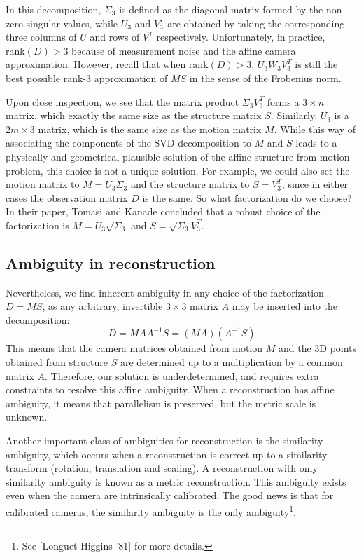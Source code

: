 \documentclass[a4paper, 12pt]{article}
\numberwithin{equation}{section}
\begin{document}
In this decomposition, $\Sigma_3$ is defined as the diagonal matrix formed by the non-zero singular values, while $U_3$ and $V^T_3$ are obtained by taking the corresponding three columns of $U$ and rows of $V^T$ respectively. Unfortunately, in practice, $\mathrm{rank}(D) > 3$ because of measurement noise and the affine camera approximation. However, recall that when $\mathrm{rank}(D) > 3$, $U_3 W_3 V_3^T$ is still the best possible rank-3 approximation of $MS$ in the sense of the Frobenius norm. 

Upon close inspection, we see that the matrix product $\Sigma_3V_3^T$ forms a $3\times n$ matrix, which exactly the same size as the structure matrix $S$. Similarly, $U_3$ is a $2m\times 3$ matrix, which is the same size as the motion matrix $M$. While this way of associating the components of the SVD decomposition to $M$ and $S$ leads to a physically and geometrical plausible solution of the affine structure from motion problem, this choice is not a unique solution. For example, we could also set the motion matrix to $M = U_3\Sigma_3$ and the structure matrix to $S = V_3^T$, since in either cases the observation matrix $D$ is the same. So what factorization do we choose? In their paper, Tomasi and Kanade concluded that a robust choice of the factorization is $M = U_3\sqrt{\Sigma_3}$ and $S = \sqrt{\Sigma_3}V_3^T$.

\subsection{Ambiguity in reconstruction}
Nevertheless, we find inherent ambiguity in any choice of the factorization $D=MS$, as any arbitrary, invertible $3 \times 3$ matrix $A$ may be inserted into the decomposition:
\begin{equation}
    D = MAA^{-1}S = (MA)(A^{-1}S)
\end{equation}
This means that the camera matrices obtained from motion $M$ and the 3D points obtained from structure $S$ are determined up to a multiplication by a common matrix $A$. Therefore, our solution is underdetermined, and requires extra constraints to resolve this affine ambiguity. When a reconstruction has affine ambiguity, it means that parallelism is preserved, but the metric scale is unknown.

Another important class of ambiguities for reconstruction is the similarity ambiguity, which occurs when a reconstruction is correct up to a similarity transform (rotation, translation and  scaling). A reconstruction with only similarity ambiguity is known as a metric reconstruction. This ambiguity exists even when the camera are intrinsically calibrated.  The good news is that for calibrated cameras, the similarity ambiguity is the only ambiguity\footnote{See [Longuet-Higgins ’81] for more details.}. 
\end{document}
